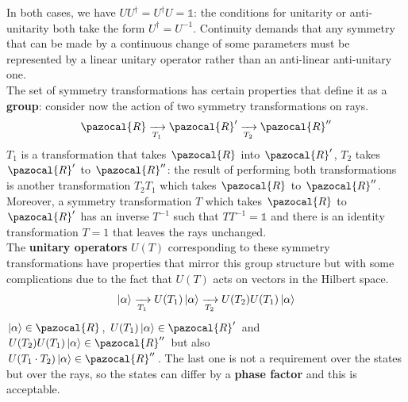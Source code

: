 \documentclass[../main.tex]{subfiles}
\begin{document}
In both cases, we have $UU^\dagger=U^\dagger U=\mathbb{1}$: the conditions for unitarity or anti-unitarity both take the form $U^\dagger=U^{-1}$. Continuity demands that any symmetry that can be made by a continuous change of some parameters must be represented by a linear unitary operator rather than an anti-linear anti-unitary one.\\
The set of symmetry transformations has certain properties that define it as a \textbf{group}: consider now the action of two symmetry transformations on rays.
\[
\pazocal{R}\xrightarrow[T_1]{}\pazocal{R}'\xrightarrow[T_2]{}\pazocal{R}''
\]
$T_1$ is a transformation that takes $\pazocal{R}$ into $\pazocal{R}'$, $T_2$ takes $\pazocal{R}'$ to $\pazocal{R}''$: the result of performing both transformations is another transformation $T_2T_1$ which takes $\pazocal{R}$ to $\pazocal{R}''$. Moreover, a symmetry transformation $T$ which takes $\pazocal{R}$ to $\pazocal{R}'$ has an inverse $T^{-1}$ such that $TT^{-1}=\mathbb{1}$ and there is an identity transformation $T=1$ that leaves the rays unchanged.\\
The \textbf{unitary operators} $U(T)$ corresponding to these symmetry transformations have properties that mirror this group structure but with some complications due to the fact that $U(T)$ acts on vectors in the Hilbert space.
\[
\ket{\alpha}\xrightarrow[T_1]{}U(T_1)\ket{\alpha}\xrightarrow[T_2]{}U(T_2)U(T_1)\ket{\alpha}
\]
$\ket{\alpha}\in\pazocal{R}$, $U(T_1)\ket{\alpha}\in\pazocal{R}'$ and $U(T_2)U(T_1)\ket{\alpha}\in\pazocal{R}''$ but also\\
$U(T_1\cdot T_2)\ket{\alpha}\in\pazocal{R}''$. The last one is not a requirement over the states but over the rays, so the states can differ by a \textbf{phase factor} and this is acceptable. 
\end{document}
